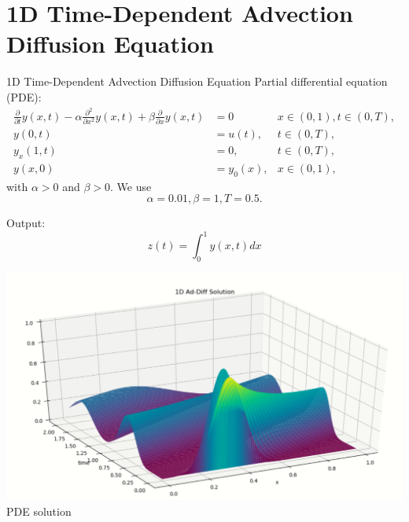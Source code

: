 \section{1D Time-Dependent Advection Diffusion Equation}

\begin{frame}{1D Time-Dependent Advection Diffusion Equation}
	Partial differential equation (PDE):
	 \begin{align*}
                         \frac{\partial}{\partial t} y(x,t) 
                        - \alpha \frac{\partial^2}{\partial x^2} y(x,t) +  \beta \frac{\partial}{\partial x} y(x,t) &= 0
                                                & x \in (0,1), t \in (0,T), \\
                         y(0,t) &= u(t),    & t \in (0,T), \\
                         y_x(1,t) &= 0,    & t \in (0,T), \\
                         y(x,0) &= y_0(x),  & x \in (0,1),
          \end{align*}
          with $\alpha > 0$ and $\beta >0$. We use
         \[
                \alpha=0.01, \beta = 1, T=0.5.
          \]
        \begin{minipage}[c]{0.6\textwidth}
	Output:
	\[
	   z(t) = \int_{0}^{1} y(x,t) dx
	\]
	\end{minipage} \hfil
         \begin{minipage}[c]{0.35\textwidth}
	\begin{center}
               \includegraphics[width=1.0\textwidth]{1D_addiffsol.PNG}\\
               PDE solution
	\end{center}
	\end{minipage}
\end{frame}
